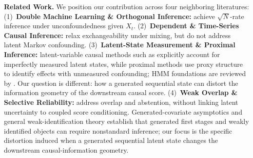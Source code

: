 \documentclass[twoside]{article}
\theoremstyle{definition}
\begin{document}
\textbf{Related Work.} We position our contribution across four neighboring literatures: (1)~\textbf{Double Machine Learning \& Orthogonal Inference:} \citet{chernozhukov2018double,chernozhukov2022automatic,foster2023orthogonal,nie2021quasi,kennedy2023towards} achieve $\sqrt{N}$-rate inference under unconfoundedness given $X_t$. (2)~\textbf{Dependent \& Time-Series Causal Inference:} \citet{ciganovic2026dml,semenova2023generalized,lewis2020double,bai2009panel,bonhomme2015grouped,hamilton1989new} relax exchangeability under mixing, but do not address latent Markov confounding. (3)~\textbf{Latent-State Measurement \& Proximal Inference:} latent-variable causal methods such as \citet{clouth2024latent} explicitly account for imperfectly measured latent states, while proximal methods \citep{miao2018identifying,tchetgen2020introduction,mastouri2021proximal} use proxy structure to identify effects with unmeasured confounding; HMM foundations are reviewed by \citet{cappe2005inference}. Our question is different: how a generated sequential state can distort the information geometry of the downstream causal score. (4)~\textbf{Weak Overlap \& Selective Reliability:} \citet{damour2021overlap,shalit2017estimating,crump2009dealing,guo2017calibration,geifman2017selective} address overlap and abstention, without linking latent uncertainty to coupled score conditioning. Generated-covariate asymptotics \citep{mammen2016generated} and general weak-identification theory \citep{kaji2021weak,bennett2023strong} establish that generated first stages and weakly identified objects can require nonstandard inference; our focus is the specific distortion induced when a generated sequential latent state changes the downstream causal-information geometry.
\end{document}
